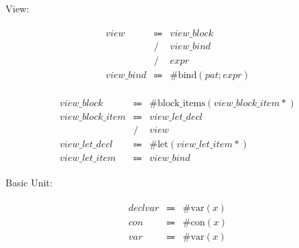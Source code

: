 View:

\begin{align*}
    \begin{array}{rcll}
        \mathit{view}
        &\Coloneq &\mathit{view\_block} \\
        &\mathrel{/} &\mathit{view\_bind} \\
        &\mathrel{/} &\mathit{expr} \\
        \mathit{view\_bind}
        &\Coloneq &\mathrm{\#bind}(\mathit{pat}; \mathit{expr})
    \end{array}
\end{align*}

\begin{align*}
    \begin{array}{rcll}
        \mathit{view\_block}
        &\Coloneq &\mathrm{\#block\_items}(\mathit{view\_block\_item}{*}) \\
        \mathit{view\_block\_item}
        &\Coloneq &\mathit{view\_let\_decl} \\
        &\mathrel{/} &\mathit{view} \\
        \mathit{view\_let\_decl}
        &\Coloneq &\mathrm{\#let}(\mathit{view\_let\_item}{*}) \\
        \mathit{view\_let\_item}
        &\Coloneq &\mathit{view\_bind}
    \end{array}
\end{align*}

Basic Unit:

\begin{align*}
    \begin{array}{rcll}
        \mathit{declvar}
        &\Coloneq &\mathrm{\#var}(x) \\
        \mathit{con}
        &\Coloneq &\mathrm{\#con}(x) \\
        \mathit{var}
        &\Coloneq &\mathrm{\#var}(x)
    \end{array}
\end{align*}
